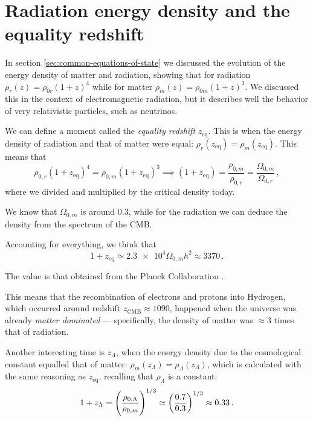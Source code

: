 \documentclass[main.tex]{subfiles}
\begin{document}
\section{Radiation energy density and the equality redshift}

In section \ref{sec:common-equations-of-state} we discussed the evolution of the energy density of matter and radiation, showing that for radiation \(\rho _r (z ) = \rho _{0r} (1+z)^{4}\) while for matter
\(\rho _m (z) = \rho_{0m} (1+z)^{3}\). 
We discussed this in the context of electromagnetic radiation, but it describes well the behavior of very relativistic particles, such as neutrinos. 

We can define a moment called the \emph{equality redshift} \(z _{\text{eq}}\).
This is when the energy density of radiation and that of matter were equal: \(\rho _r (z _{\text{eq}}) = \rho _m (z _{\text{eq}})\).
This means that 
%
\begin{equation}
\rho_{0,r} (1+z _{\text{eq}})^{4} = \rho_{0,m} (1+z _{\text{eq}})^{3} \implies
(1+z _{\text{eq}}) = \frac{\rho _{0,m}}{\rho _{0,r}} 
  = \frac{\Omega_{0,m}}{\Omega_{0,r}}
\,,
\end{equation}
%
where we divided and multiplied by the critical density today. 

We know that \(\Omega_{0,m}\) is around \num{0.3}, while for the radiation we can deduce the density from the spectrum of the CMB.

Accounting for everything, we think that 
%
\begin{equation}
  1 + z _{\text{eq}} \simeq \num{2.3e4} \Omega_{0, m} h^2
  \approx 3370
\,.
\end{equation}

The value is that obtained from the Planck Collaboration \cite[]{PlanckCollaboration:2016XIII}.

This means that the recombination of electrons and protons into Hydrogen, which occurred around redshift \(z _{\text{CMB}} \approx 1090\), happened when the universe was already \emph{matter dominated} --- specifically, the density of matter was \(\approx 3\) times that of radiation.

Another interesting time is \(z_\Lambda \), when the energy density due to the cosmological constant equalled that of matter:  \(\rho _m (z_{\Lambda }) = \rho _\Lambda (z_\Lambda )\), which is calculated with the same reasoning as \(z _{\text{eq}}\), recalling that \(\rho_{\Lambda }\) is a constant:
\begin{equation}
1+ z_\Lambda = \qty(\frac{\rho_{0, \Lambda }}{\rho_{0,m}})^{1/3} \simeq \qty(\frac{0.7}{0.3})^{1/3} \approx \num{0.33}
\,.
\end{equation}
\end{document}
